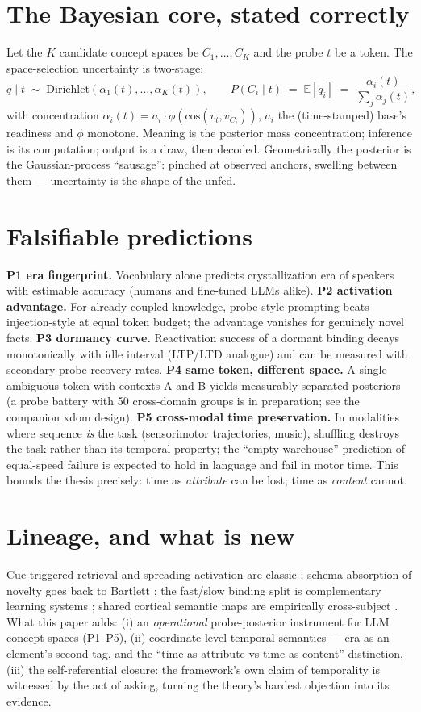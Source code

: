 \documentclass[12pt, a4paper]{article}
\begin{document}
\section{The Bayesian core, stated correctly}
Let the $K$ candidate concept spaces be $C_1,\dots,C_K$ and the probe $t$ be a token. The space-selection uncertainty is two-stage:
\[
q \mid t \;\sim\; \mathrm{Dirichlet}(\alpha_1(t),\dots,\alpha_K(t)),
\qquad
P(C_i \mid t) \;=\; \mathbb{E}[q_i] \;=\; \frac{\alpha_i(t)}{\sum_j \alpha_j(t)},
\]
with concentration $\alpha_i(t)=a_i\cdot\phi\!\left(\mathrm{cos}(v_t, v_{C_i})\right)$, $a_i$ the (time-stamped) base's readiness and $\phi$ monotone. Meaning is the posterior mass concentration; inference is its computation; output is a draw, then decoded. Geometrically the posterior is the Gaussian-process ``sausage'': pinched at observed anchors, swelling between them --- uncertainty is the shape of the unfed.

\section{Falsifiable predictions}
\textbf{P1 era fingerprint.} Vocabulary alone predicts crystallization era of speakers with estimable accuracy (humans and fine-tuned LLMs alike).
\textbf{P2 activation advantage.} For already-coupled knowledge, probe-style prompting beats injection-style at equal token budget; the advantage vanishes for genuinely novel facts.
\textbf{P3 dormancy curve.} Reactivation success of a dormant binding decays monotonically with idle interval (LTP/LTD analogue) and can be measured with secondary-probe recovery rates.
\textbf{P4 same token, different space.} A single ambiguous token with contexts A and B yields measurably separated posteriors (a probe battery with 50 cross-domain groups is in preparation; see the companion xdom design).
\textbf{P5 cross-modal time preservation.} In modalities where sequence \emph{is} the task (sensorimotor trajectories, music), shuffling destroys the task rather than its temporal property; the ``empty warehouse'' prediction of equal-speed failure is expected to hold in language and fail in motor time. This bounds the thesis precisely: time as \emph{attribute} can be lost; time as \emph{content} cannot.

\section{Lineage, and what is new}
Cue-triggered retrieval and spreading activation are classic \cite{collinsloftus1975}; schema absorption of novelty goes back to Bartlett \cite{bartlett1932}; the fast/slow binding split is complementary learning systems \cite{cls1995}; shared cortical semantic maps are empirically cross-subject \cite{huth2016}. What this paper adds: (i) an \emph{operational} probe-posterior instrument for LLM concept spaces (P1--P5), (ii) coordinate-level temporal semantics --- era as an element's second tag, and the ``time as attribute vs time as content'' distinction, (iii) the self-referential closure: the framework's own claim of temporality is witnessed by the act of asking, turning the theory's hardest objection into its evidence.
\end{document}
